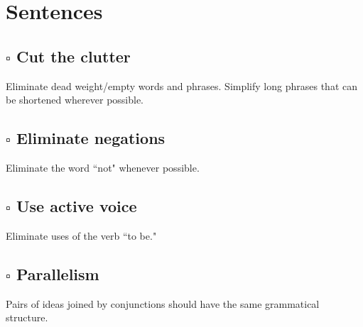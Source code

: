 \documentclass{article}
\begin{document}
\section*{Sentences}
\begin{adjustwidth}{1cm}{}
    \subsection*{$\square$ Cut the clutter}

    \begin{adjustwidth}{1cm}{}
        Eliminate dead weight/empty words and phrases. Simplify long phrases that can be shortened wherever possible.
    \end{adjustwidth}

    \subsection*{$\square$ Eliminate negations}

    \begin{adjustwidth}{1cm}{}
        Eliminate the word ``not" whenever possible. 
    \end{adjustwidth}

    \subsection*{$\square$ Use active voice}

    \begin{adjustwidth}{1cm}{}
        Eliminate uses of the verb ``to be."
    \end{adjustwidth}

    \subsection*{$\square$ Parallelism}

    \begin{adjustwidth}{1cm}{}
        Pairs of ideas joined by conjunctions should have the same grammatical structure. 
    \end{adjustwidth}
\end{adjustwidth}
\end{document}
